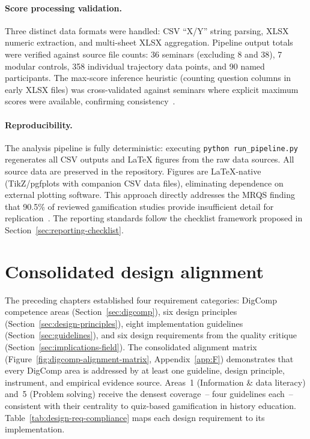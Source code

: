 \paragraph{Score processing validation.}
Three distinct data formats were handled: CSV ``X/Y'' string parsing, XLSX numeric extraction, and multi-sheet XLSX aggregation. Pipeline output totals were verified against source file counts: 36 seminars (excluding 8 and 38), 7 modular controls, 358 individual trajectory data points, and 90 named participants. The max-score inference heuristic (counting question columns in early XLSX files) was cross-validated against seminars where explicit maximum scores were available, confirming consistency~\cite{ary}.

\paragraph{Reproducibility.}
The analysis pipeline is fully deterministic: executing \texttt{python run\_pipeline.py} regenerates all CSV outputs and LaTeX figures from the raw data sources. All source data are preserved in the repository. Figures are LaTeX-native (TikZ/pgfplots with companion CSV data files), eliminating dependence on external plotting software. This approach directly addresses the MRQS finding that 90.5\% of reviewed gamification studies provide insufficient detail for replication~\cite{Korniienko2025mrqs}. The reporting standards follow the checklist framework proposed in Section~\ref{sec:reporting-checklist}.


\section{Consolidated design alignment} \label{sec:consolidated-alignment}

The preceding chapters established four requirement categories: DigComp competence areas (Section~\ref{sec:digcomp}), six design principles (Section~\ref{sec:design-principles}), eight implementation guidelines (Section~\ref{sec:guidelines}), and six design requirements from the quality critique (Section~\ref{sec:implications-field}). The consolidated alignment matrix (Figure~\ref{fig:digcomp-alignment-matrix}, Appendix~\ref{app:F}) demonstrates that every DigComp area is addressed by at least one guideline, design principle, instrument, and empirical evidence source. Areas~1 (Information \& data literacy) and~5 (Problem solving) receive the densest coverage~-- four guidelines each~-- consistent with their centrality to quiz-based gamification in history education. Table~\ref{tab:design-req-compliance} maps each design requirement to its implementation.

